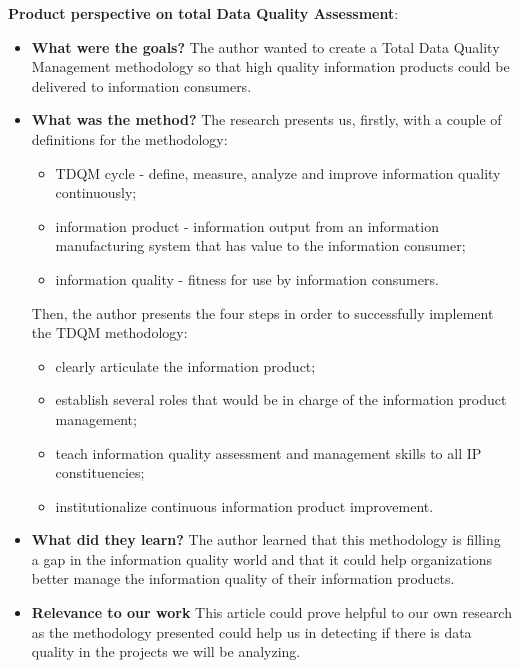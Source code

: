\documentclass{mprop}
\begin{document}
\textbf{Product perspective on total Data Quality Assessment}\cite{wang1998product}:
\begin{itemize}
  \item \textbf{What were the goals?}
    The author wanted to create a Total Data Quality Management methodology so that
    high quality information products could be delivered to information consumers.
  \item \textbf{What was the method?}
    The research presents us, firstly, with a couple of definitions for the methodology:
      \begin{itemize}
        \item TDQM cycle - define, measure, analyze and improve information quality continuously;
        \item information product - information output from an information manufacturing system
          that has value to the information consumer;
        \item information quality - fitness for use by information consumers.
      \end{itemize}
    Then, the author presents the four steps in order to successfully implement the TDQM methodology:
      \begin{itemize}
        \item clearly articulate the information product;
        \item establish several roles that would be in charge of the information product management;
        \item teach information quality assessment and management skills to all IP constituencies;
        \item institutionalize continuous information product improvement.
      \end{itemize}
  \item \textbf{What did they learn?}
    The author learned that this methodology is filling a gap in the information quality
    world and that it could help organizations better manage the information quality of their
    information products.
  \item \textbf{Relevance to our work}
    This article could prove helpful to our own research as the methodology presented could help
    us in detecting if there is data quality in the projects we will be analyzing.
\end{itemize}
\end{document}
